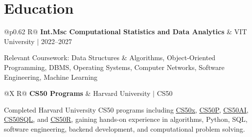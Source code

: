 \documentclass[a4paper,10pt]{article}
\newcommand{\ulink}[2]{\href{#1}{\uline{#2}}}
\newcommand{\subheading}[1]{{\color[HTML]{0A0A0A}\fontsize{12}{14}\selectfont\bfseries #1}}
\newcommand{\meta}[1]{{\color[HTML]{5C5C5C}\fontsize{10.5}{12.5}\selectfont #1}}
\begin{document}
\vspace{4pt}

\section{Education}
\vspace{3pt}

\begin{tabularx}{\linewidth}{@{}p{0.62\linewidth} R@{}}
  \subheading{Int.Msc Computational Statistics and Data Analytics} &
  \meta{VIT University $|$ 2022--2027}
\end{tabularx}
\vspace{2pt}
{\color[HTML]{3A3A3A}\fontsize{11}{15}\selectfont Relevant Coursework: Data Structures \& Algorithms, Object-Oriented Programming, DBMS, Operating Systems, Computer Networks, Software Engineering, Machine Learning}

\vspace{6pt}

\begin{tabularx}{\linewidth}{@{}X R@{}}
  \subheading{CS50 Programs} &
  \meta{Harvard University $|$ CS50}
\end{tabularx}
\vspace{2pt}
{\color[HTML]{3A3A3A}\fontsize{11}{15}\selectfont Completed Harvard University CS50 programs including \ulink{https://cs50.harvard.edu/certificates/b14b78df-e05c-413e-a607-1dd27303053a}{CS50x}, \ulink{https://cs50.harvard.edu/certificates/32477052-9db4-49c4-a5a4-d7e58429ca2c}{CS50P}, \ulink{https://cs50.harvard.edu/certificates/9cdb4d4a-1250-4f8e-9fd7-191864e0f919}{CS50AI}, \ulink{https://cs50.harvard.edu/certificates/bc486f24-f085-4e61-8536-80940b97a1b9}{CS50SQL}, and \ulink{https://cs50.harvard.edu/certificates/666838e6-a053-4d82-b179-a60fe745fd84}{CS50R}, gaining hands-on experience in algorithms, Python, SQL, software engineering, backend development, and computational problem solving.}
\end{document}
